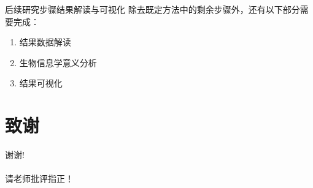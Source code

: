 \documentclass{beamer}
\begin{document}
	

	\begin{frame}{后续研究步骤}{结果解读与可视化}
		除去既定方法中的剩余步骤外，还有以下部分需要完成：
		\begin{enumerate}
			\item 结果数据解读
			\item 生物信息学意义分析
			\item 结果可视化
		\end{enumerate}
	\end{frame}

	\section*{致谢}  
	\begin{frame}
		\begin{center}
			\textcolor{myNewColorA}{\huge {谢谢!\\ \quad \\ 请老师批评指正！}}
		\end{center}
	\end{frame}
	
\end{document}
